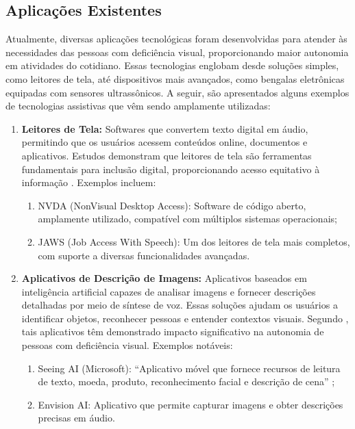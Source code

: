 \subsection{Aplicações Existentes}

Atualmente, diversas aplicações tecnológicas foram desenvolvidas para atender às necessidades das pessoas com deficiência visual, proporcionando maior autonomia em atividades do cotidiano. Essas tecnologias englobam desde soluções simples, como leitores de tela, até dispositivos mais avançados, como bengalas eletrônicas equipadas com sensores ultrassônicos. A seguir, são apresentados alguns exemplos de tecnologias assistivas que vêm sendo amplamente utilizadas:

\begin{enumerate}
    \item \textbf{Leitores de Tela:} Softwares que convertem texto digital em áudio, permitindo que os usuários acessem conteúdos online, documentos e aplicativos. Estudos demonstram que leitores de tela são ferramentas fundamentais para inclusão digital, proporcionando acesso equitativo à informação \cite{brilli2024}. Exemplos incluem:
        \begin{enumerate}
            \item NVDA (NonVisual Desktop Access): Software de código aberto, amplamente utilizado, compatível com múltiplos sistemas operacionais;
            \item JAWS (Job Access With Speech): Um dos leitores de tela mais completos, com suporte a diversas funcionalidades avançadas.
        \end{enumerate}
    \item \textbf{Aplicativos de Descrição de Imagens:} Aplicativos baseados em inteligência artificial capazes de analisar imagens e fornecer descrições detalhadas por meio de síntese de voz. Essas soluções ajudam os usuários a identificar objetos, reconhecer pessoas e entender contextos visuais. Segundo , tais aplicativos têm demonstrado impacto significativo na autonomia de pessoas com deficiência visual. Exemplos notáveis:
        \begin{enumerate}
            \item Seeing AI (Microsoft): “Aplicativo móvel que fornece recursos de leitura de texto, moeda, produto, reconhecimento facial e descrição de cena” \cite{Dognin2022};
            \item Envision AI: Aplicativo que permite capturar imagens e obter descrições precisas em áudio.

\end{enumerate}
\end{enumerate}
